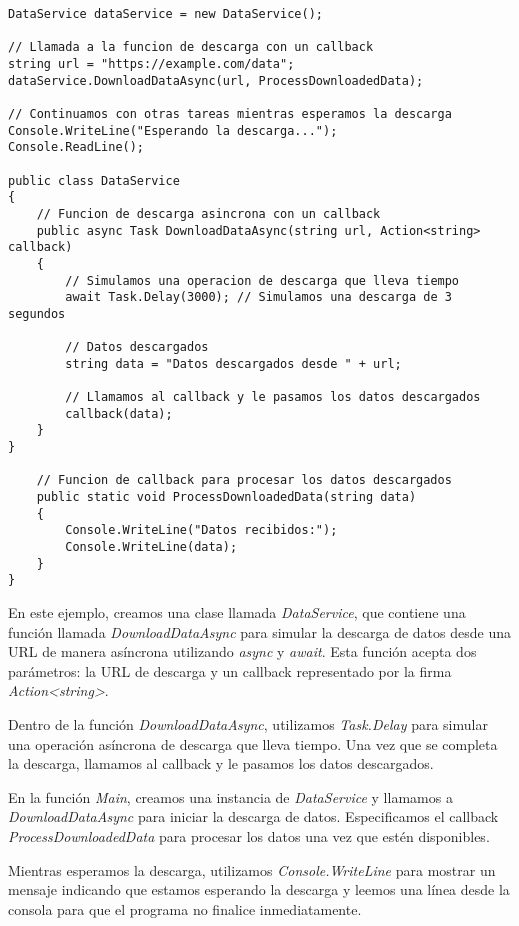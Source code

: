 \documentclass[executivepaper]{article}
\begin{document}
\begin{lstlisting}
DataService dataService = new DataService();

// Llamada a la funcion de descarga con un callback
string url = "https://example.com/data";
dataService.DownloadDataAsync(url, ProcessDownloadedData);

// Continuamos con otras tareas mientras esperamos la descarga
Console.WriteLine("Esperando la descarga...");
Console.ReadLine();    

public class DataService
{
    // Funcion de descarga asincrona con un callback
    public async Task DownloadDataAsync(string url, Action<string> callback)
    {
        // Simulamos una operacion de descarga que lleva tiempo
        await Task.Delay(3000); // Simulamos una descarga de 3 segundos

        // Datos descargados
        string data = "Datos descargados desde " + url;

        // Llamamos al callback y le pasamos los datos descargados
        callback(data);
    }
}

    // Funcion de callback para procesar los datos descargados
    public static void ProcessDownloadedData(string data)
    {
        Console.WriteLine("Datos recibidos:");
        Console.WriteLine(data);
    }
}
\end{lstlisting}

En este ejemplo, creamos una clase llamada \emph{DataService}, que contiene una función llamada \emph{DownloadDataAsync} para simular la descarga de datos desde una URL de manera asíncrona utilizando \emph{async} y \emph{await}. Esta función acepta dos parámetros: la URL de descarga y un callback representado por la firma \emph{Action<string>}.

Dentro de la función \emph{DownloadDataAsync}, utilizamos \emph{Task.Delay} para simular una operación asíncrona de descarga que lleva tiempo. Una vez que se completa la descarga, llamamos al callback y le pasamos los datos descargados.

En la función \emph{Main}, creamos una instancia de \emph{DataService} y llamamos a \emph{DownloadDataAsync} para iniciar la descarga de datos. Especificamos el callback \emph{ProcessDownloadedData} para procesar los datos una vez que estén disponibles.

Mientras esperamos la descarga, utilizamos \emph{Console.WriteLine} para mostrar un mensaje indicando que estamos esperando la descarga y leemos una línea desde la consola para que el programa no finalice inmediatamente.
\end{document}
